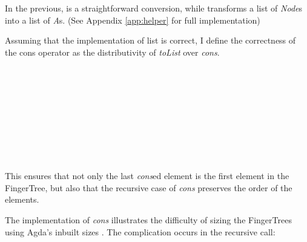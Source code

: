 \documentclass[12pt,twoside,notitlepage]{report}
\begin{document}
In the previous,  is a straightforward conversion, while  transforms a list of \textit{Node}s into a list of \textit{A}s. (See Appendix \ref{app:helper} for full implementation)

Assuming that the implementation of list is correct, I define the correctness of the cons operator as the distributivity of \textit{toList} over \textit{cons}.

\begin{code}
\\
\> \AgdaSymbol{:}  \AgdaSymbol{\{}\AgdaSymbol{\}\{} \AgdaSymbol{:}  \AgdaSymbol{\}\{} \AgdaSymbol{:}   \AgdaSymbol{\}}\<%
\\
\>[6]\<[8]%
\>[8]  \AgdaSymbol{:}   \<%
\\
\>[6]\<[8]%
\>[8]  \AgdaSymbol{:}    \<%
\\
\>[6]\<[8]%
\>[8]\AgdaSymbol{\{} \AgdaSymbol{:} \AgdaSymbol{\}} \<%
\\
\>[6]\<[8]%
\>[8]\AgdaSymbol{(} \AgdaSymbol{:} \AgdaSymbol{)} \<%
\\
\>[6]\<[8]%
\>[8]\AgdaSymbol{(} \AgdaSymbol{:}    \AgdaSymbol{\{}\AgdaSymbol{\})} \<%
\\
\>[6]\<[8]%
\>[8] \AgdaSymbol{(}  \AgdaSymbol{)}  \AgdaSymbol{(}  \AgdaInductiveConstructor{[]}\AgdaSymbol{)} \AgdaFunction{++} \AgdaSymbol{(} \AgdaSymbol{)}\<%
\\
\end{code} 

This ensures that not only the last \textit{cons}ed element is the first element in the FingerTree, but also that the recursive case of \textit{cons} preserves the order of the elements.

The implementation of \textit{cons} illustrates the difficulty of sizing the FingerTrees using Agda's inbuilt sizes \cite{sizedtypes}. The complication occurs in the recursive call: 
\end{document}
